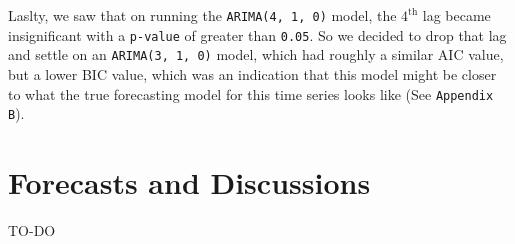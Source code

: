 \documentclass[12pt]{article}
\begin{document}
Laslty, we saw that on running the \texttt{ARIMA(4, 1, 0)} model, the $4^\text{th}$ lag became insignificant with a \texttt{p-value} of greater than \texttt{0.05}. So we decided to drop that lag and settle on an \texttt{ARIMA(3, 1, 0)} model, which had roughly a similar AIC value, but a lower BIC value, which was an indication that this model might be closer to what the true forecasting model for this time series looks like (See \texttt{Appendix B}).



\section{Forecasts and Discussions}

TO-DO


\begin{center}
        \printbibliography
\end{center}

\bigskip\bigskip\bigskip

\begin{center}
        \Large{}
\end{center}

\bigskip\bigskip

\begin{center}
        \Large{}
\end{center}

\bigskip\bigskip

\begin{center}
        \Large{}
\end{center}
\end{document}
